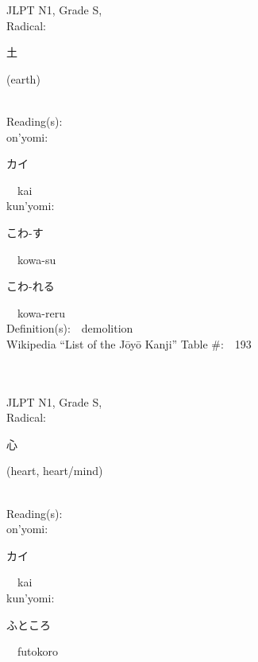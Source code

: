 \begin{multicols}{2}
{JLPT N1, Grade S, \\Radical:\ \ {\begin{CJK}{UTF8}{min} 土 \end{CJK}} (earth) } \\
Reading(s):\ \ \\
{\hspace*{1em}}on'yomi:\ \ \\
{\hspace*{2em}}{\begin{CJK}{UTF8}{min} カイ \end{CJK}}\ \ kai\ \ \\
{\hspace*{1em}}kun'yomi:\ \ \\
{\hspace*{2em}}{\begin{CJK}{UTF8}{min} こわ-す \end{CJK}}\ \ kowa-su\ \ \\
{\hspace*{2em}}{\begin{CJK}{UTF8}{min} こわ-れる \end{CJK}}\ \ kowa-reru\ \ \\
Definition(s):\ \ demolition \\
Wikipedia ``List of the J\=oy\=o Kanji'' Table \#:\ \ 193 \\
\ \ \\
{\fontsize{34pt}{40pt}  }\ \ \\
{JLPT N1, Grade S, \\Radical:\ \ {\begin{CJK}{UTF8}{min} 心 \end{CJK}} (heart, heart/mind) } \\
Reading(s):\ \ \\
{\hspace*{1em}}on'yomi:\ \ \\
{\hspace*{2em}}{\begin{CJK}{UTF8}{min} カイ \end{CJK}}\ \ kai\ \ \\
{\hspace*{1em}}kun'yomi:\ \ \\
{\hspace*{2em}}{\begin{CJK}{UTF8}{min} ふところ \end{CJK}}\ \ futokoro\ \ \\

\end{multicols}
